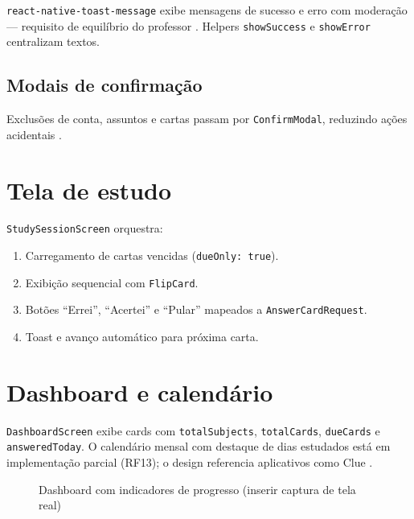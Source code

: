 \texttt{react-native-toast-message} exibe mensagens de sucesso e erro com moderação --- requisito de equilíbrio do professor \cite{toast_message_rn}. Helpers \texttt{showSuccess} e \texttt{showError} centralizam textos.

\subsection{Modais de confirmação}

Exclusões de conta, assuntos e cartas passam por \texttt{ConfirmModal}, reduzindo ações acidentais \cite{mobile_first_nielsen}.

\section{Tela de estudo}

\texttt{StudySessionScreen} orquestra:
\begin{enumerate}
    \item Carregamento de cartas vencidas (\texttt{dueOnly: true}).
    \item Exibição sequencial com \texttt{FlipCard}.
    \item Botões ``Errei'', ``Acertei'' e ``Pular'' mapeados a \texttt{AnswerCardRequest}.
    \item Toast e avanço automático para próxima carta.
\end{enumerate}

\section{Dashboard e calendário}

\texttt{DashboardScreen} exibe cards com \texttt{totalSubjects}, \texttt{totalCards}, \texttt{dueCards} e \texttt{answeredToday}. O calendário mensal com destaque de dias estudados está em implementação parcial (RF13); o design referencia aplicativos como Clue \cite{clue_app}.

\begin{figure}[htbp]
    \centering
    \caption{Dashboard com indicadores de progresso (inserir captura de tela real)}
    \label{fig:dashboard-print}
\end{figure}

